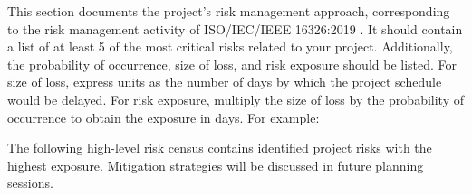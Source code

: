 This section documents the project's risk management approach, corresponding to the risk management activity of ISO/IEC/IEEE 16326:2019 \cite{ISO16326}. It should contain a list of at least 5 of the most critical risks related to your project. Additionally, the probability of occurrence, size of loss, and risk exposure should be listed. For size of loss, express units as the number of days by which the project schedule would be delayed. For risk exposure, multiply the size of loss by the probability of occurrence to obtain the exposure in days. For example:

The following high-level risk census contains identified project risks with the highest exposure. Mitigation strategies will be discussed in future planning sessions.

\begin{table}[h]
\caption{Overview of highest exposure project risks} 
\end{table}